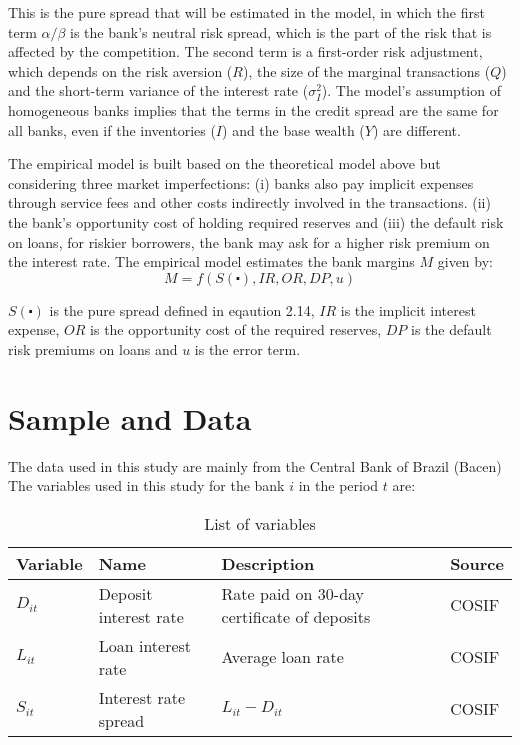 This is the pure spread that will be estimated in the model, in which the first term $\alpha/\beta$ is the bank's neutral risk spread, which is the part of the risk that is affected by the competition. The second term is a first-order risk adjustment, which depends on the risk aversion ($R$), the size of the marginal transactions ($Q$) and the short-term variance of the interest rate ($\sigma_I^2$). The model's assumption of homogeneous banks implies that the terms in the credit spread are the same for all banks, even if the inventories ($I$) and the base wealth ($Y$) are different. 

The empirical model is built based on the theoretical model above but considering three market imperfections: (i) banks also pay implicit expenses through service fees and other costs indirectly involved in the transactions. (ii) the bank's opportunity cost of holding required reserves and (iii) the default risk on loans, for riskier borrowers, the bank may ask for a higher risk premium on the interest rate. The empirical model estimates the bank margins $M$ given by:
\begin{equation}
  M = f(S(\centerdot), IR, OR, DP, u)
\end{equation}

$S(\centerdot)$ is the pure spread defined in eqaution 2.14, $IR$ is the implicit interest expense, $OR$ is the opportunity cost of the required reserves, $DP$ is the default risk premiums on loans and $u$ is the error term.

\chapter{Sample and Data}

The data used in this study are mainly from the Central Bank of Brazil (Bacen) 
The variables used in this study for the bank $i$ in the period $t$ are:

\begin{table}[h!]
\centering
\begin{tabular}{ p{1.5cm} p{4cm} p{6cm} p{3cm}  }
\hline
Variable & Name & Description & Source \\ [0.5ex] 
\hline\hline
$D_{it}$ & Deposit interest rate & Rate paid on 30-day certificate of deposits & COSIF \\
$L_{it}$ & Loan interest rate & Average loan rate & COSIF \\
$S_{it}$ & Interest rate spread & $L_{it} - D_{it}$ & COSIF \\ 
[1ex] 
\hline
\end{tabular}
\caption{List of variables}
\label{table:1}
\end{table}

